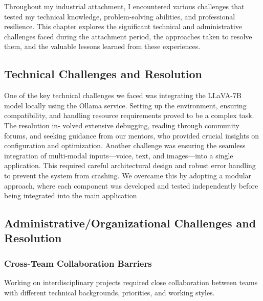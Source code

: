 \documentclass[12pt,a4paper]{article}
\begin{document}
Throughout my industrial attachment, I encountered various challenges that tested my technical knowledge, problem-solving abilities, and professional resilience. This chapter explores the significant technical and administrative challenges faced during the attachment period, the approaches taken to resolve them, and the valuable lessons learned from these experiences.

\subsection{Technical Challenges and Resolution}

One of the key technical challenges we faced was integrating the LLaVA-7B model
locally using the Ollama service. Setting up the environment, ensuring compatibility,
and handling resource requirements proved to be a complex task. The resolution in-
volved extensive debugging, reading through community forums, and seeking guidance
from our mentors, who provided crucial insights on configuration and optimization.
Another challenge was ensuring the seamless integration of multi-modal inputs—voice,
text, and images—into a single application. This required careful architectural design
and robust error handling to prevent the system from crashing. We overcame this
by adopting a modular approach, where each component was developed and tested
independently before being integrated into the main application


\subsection{Administrative/Organizational Challenges and Resolution}

\subsubsection{Cross-Team Collaboration Barriers}

Working on interdisciplinary projects required close collaboration between teams with different technical backgrounds, priorities, and working styles.
\end{document}
